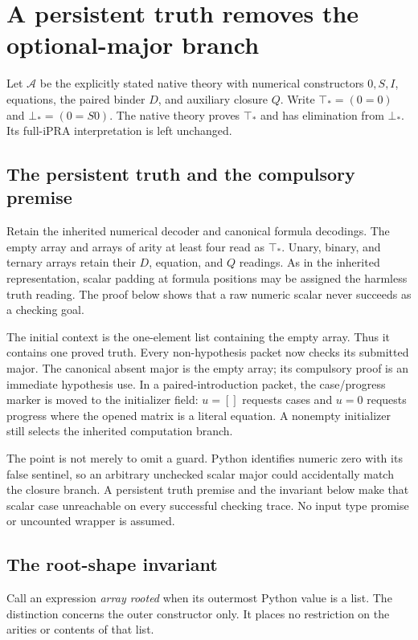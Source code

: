 \section{A persistent truth removes the optional-major branch}
\label{sec:mandatory-major}

Let $\mathcal A$ be the explicitly stated native theory with numerical
constructors $0,S,I$, equations, the paired binder $D$, and auxiliary
closure $Q$.  Write $\top_*=(0=0)$ and $\bot_*=(0=S0)$.
The native theory proves $\top_*$ and has elimination from $\bot_*$.
Its full-iPRA interpretation is left unchanged.

\subsection{The persistent truth and the compulsory premise}

Retain the inherited numerical decoder and canonical formula decodings.
The empty array and arrays of arity at least four read as $\top_*$.
Unary, binary, and ternary arrays retain their $D$, equation, and $Q$
readings.  As in the inherited representation, scalar padding at formula
positions may be assigned the harmless truth reading.  The proof below
shows that a raw numeric scalar never succeeds as a checking goal.

The initial context is the one-element list containing the empty array.
Thus it contains one proved truth.  Every non-hypothesis packet now
checks its submitted major.  The canonical absent major is the empty
array; its compulsory proof is an immediate hypothesis use.  In a
paired-introduction packet, the case/progress marker is moved to the
initializer field: $u=[]$ requests cases and $u=0$ requests progress
where the opened matrix is a literal equation.  A nonempty initializer
still selects the inherited computation branch.

The point is not merely to omit a guard.  Python identifies numeric
zero with its false sentinel, so an arbitrary unchecked scalar major
could accidentally match the closure branch.  A persistent truth premise
and the invariant below make that scalar case unreachable on every
successful checking trace.  No input type promise or uncounted wrapper
is assumed.

\subsection{The root-shape invariant}

Call an expression \emph{array rooted} when its outermost Python value
is a list.  The distinction concerns the outer constructor only.
It places no restriction on the arities or contents of that list.

